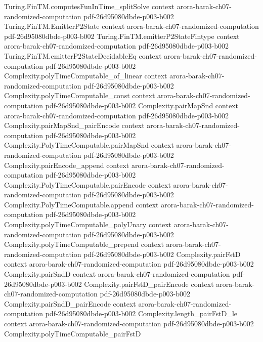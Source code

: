 \begin{theorem}
  {Turing.FinTM.computesFunInTime_splitSolve}
  {context}
  {arora-barak-ch07-randomized-computation}
  {pdf-26d95080dbde-p003-b002}
\proofstep
  {Turing.FinTM.EmitterP2State}
  {context}
  {arora-barak-ch07-randomized-computation}
  {pdf-26d95080dbde-p003-b002}
\proofstep
  {Turing.FinTM.emitterP2StateFintype}
  {context}
  {arora-barak-ch07-randomized-computation}
  {pdf-26d95080dbde-p003-b002}
\proofstep
  {Turing.FinTM.emitterP2StateDecidableEq}
  {context}
  {arora-barak-ch07-randomized-computation}
  {pdf-26d95080dbde-p003-b002}
\proofstep
  {Complexity.polyTimeComputable_of_linear}
  {context}
  {arora-barak-ch07-randomized-computation}
  {pdf-26d95080dbde-p003-b002}
\proofstep
  {Complexity.polyTimeComputable_const}
  {context}
  {arora-barak-ch07-randomized-computation}
  {pdf-26d95080dbde-p003-b002}
\proofstep
  {Complexity.pairMapSnd}
  {context}
  {arora-barak-ch07-randomized-computation}
  {pdf-26d95080dbde-p003-b002}
\proofstep
  {Complexity.pairMapSnd_pairEncode}
  {context}
  {arora-barak-ch07-randomized-computation}
  {pdf-26d95080dbde-p003-b002}
\proofstep
  {Complexity.PolyTimeComputable.pairMapSnd}
  {context}
  {arora-barak-ch07-randomized-computation}
  {pdf-26d95080dbde-p003-b002}
\proofstep
  {Complexity.pairEncode_append}
  {context}
  {arora-barak-ch07-randomized-computation}
  {pdf-26d95080dbde-p003-b002}
\proofstep
  {Complexity.PolyTimeComputable.pairEncode}
  {context}
  {arora-barak-ch07-randomized-computation}
  {pdf-26d95080dbde-p003-b002}
\proofstep
  {Complexity.PolyTimeComputable.append}
  {context}
  {arora-barak-ch07-randomized-computation}
  {pdf-26d95080dbde-p003-b002}
\proofstep
  {Complexity.polyTimeComputable_polyUnary}
  {context}
  {arora-barak-ch07-randomized-computation}
  {pdf-26d95080dbde-p003-b002}
\proofstep
  {Complexity.polyTimeComputable_prepend}
  {context}
  {arora-barak-ch07-randomized-computation}
  {pdf-26d95080dbde-p003-b002}
\proofstep
  {Complexity.pairFstD}
  {context}
  {arora-barak-ch07-randomized-computation}
  {pdf-26d95080dbde-p003-b002}
\proofstep
  {Complexity.pairSndD}
  {context}
  {arora-barak-ch07-randomized-computation}
  {pdf-26d95080dbde-p003-b002}
\proofstep
  {Complexity.pairFstD_pairEncode}
  {context}
  {arora-barak-ch07-randomized-computation}
  {pdf-26d95080dbde-p003-b002}
\proofstep
  {Complexity.pairSndD_pairEncode}
  {context}
  {arora-barak-ch07-randomized-computation}
  {pdf-26d95080dbde-p003-b002}
\proofstep
  {Complexity.length_pairFstD_le}
  {context}
  {arora-barak-ch07-randomized-computation}
  {pdf-26d95080dbde-p003-b002}
\proofstep
  {Complexity.polyTimeComputable_pairFstD}

\end{theorem}
